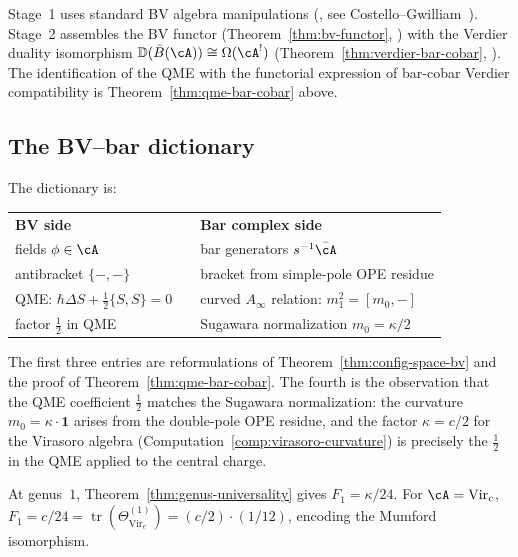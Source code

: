 \begin{remark}[Scope]
Stage~1 uses standard BV algebra manipulations (\ClaimStatusProvedElsewhere,
see Costello--Gwilliam~\cite{CG17}).  Stage~2 assembles the BV
functor (Theorem~\ref{thm:bv-functor}, \ClaimStatusProvedHere) with
the Verdier duality isomorphism $\mathbb{D}(\bar{B}(\cA)) \cong \Omega(\cA^!)$
(Theorem~\ref{thm:verdier-bar-cobar}, \ClaimStatusProvedHere).  The
identification of the QME with the functorial expression of bar-cobar
Verdier compatibility is Theorem~\ref{thm:qme-bar-cobar} above.
\end{remark}

\subsection{The BV--bar dictionary}
\label{subsec:bv-bar-identification}

The dictionary is:
\begin{center}
\begin{tabular}{lcl}
\textbf{BV side} && \textbf{Bar complex side} \\[2pt]
fields $\phi \in \cA$ && bar generators $s^{-1}\bar{\cA}$ \\
antibracket $\{-,-\}$ && bracket from simple-pole OPE residue \\
QME: $\hbar\Delta S + \tfrac{1}{2}\{S,S\} = 0$
  && curved $A_\infty$ relation: $m_1^2 = [m_0, -]$ \\
factor $\tfrac{1}{2}$ in QME && Sugawara normalization $m_0 = \kappa/2$
\end{tabular}
\end{center}
The first three entries are reformulations of
Theorem~\ref{thm:config-space-bv} and the proof of
Theorem~\ref{thm:qme-bar-cobar}.  The fourth is the observation
that the QME coefficient $\tfrac{1}{2}$ matches the Sugawara
normalization: the curvature $m_0 = \kappa \cdot \mathbf{1}$ arises
from the double-pole OPE residue, and the factor $\kappa = c/2$ for
the Virasoro algebra (Computation~\ref{comp:virasoro-curvature})
is precisely the $\tfrac{1}{2}$ in the QME applied to the central
charge.



\begin{remark}\label{rem:genus1-bv}
At genus~$1$, Theorem~\ref{thm:genus-universality} gives $F_1 = \kappa/24$.  For $\cA = \mathrm{Vir}_c$, $F_1 = c/24 = \operatorname{tr}(\Theta_{\mathrm{Vir}_c}^{(1)}) = (c/2)\cdot(1/12)$, encoding the Mumford isomorphism.
\end{remark}

